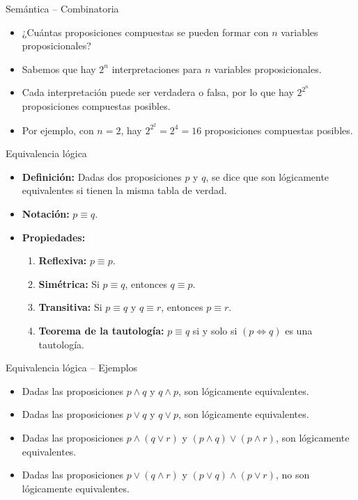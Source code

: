 \documentclass[dvisvgm,hypertex,aspectratio=169]{beamer}
\begin{document}
\begin{frame}{Semántica -- Combinatoria}
  \begin{itemize}[<+->]
    \item ¿Cuántas proposiciones compuestas se pueden formar con $n$ variables proposicionales?
    \item Sabemos que hay $2^n$ interpretaciones para $n$ variables proposicionales.
    \item Cada interpretación puede ser verdadera o falsa, por lo que hay $2^{2^n}$ proposiciones compuestas posibles.
    \item Por ejemplo, con $n = 2$, hay $2^{2^2} = 2^4 = 16$ proposiciones compuestas posibles.
  \end{itemize}
\end{frame}
\begin{frame}{Equivalencia lógica}
  \begin{itemize}[<+->]
    \item \textbf{Definición:} Dadas dos proposiciones $p$ y $q$, se dice que son lógicamente equivalentes si tienen la misma tabla de verdad.
    \item \textbf{Notación:} $p \equiv q$.
    \item \textbf{Propiedades:}
    \begin{enumerate}
      \item \textbf{Reflexiva:} $p \equiv p$.
      \item \textbf{Simétrica:} Si $p \equiv q$, entonces $q \equiv p$.
      \item \textbf{Transitiva:} Si $p \equiv q$ y $q \equiv r$, entonces $p \equiv r$.
      \item \textbf{Teorema de la tautología:} $p \equiv q$ si y solo si $(p \iff q)$ es una tautología.
    \end{enumerate}
  \end{itemize}
\end{frame}
\begin{frame}{Equivalencia lógica -- Ejemplos}
  \begin{itemize}[<+->]
    \item Dadas las proposiciones $p \land q$ y $q \land p$, son lógicamente equivalentes.
    \item Dadas las proposiciones $p \lor q$ y $q \lor p$, son lógicamente equivalentes.
    \item Dadas las proposiciones $p \land (q \lor r)$ y $(p \land q) \lor (p \land r)$, son lógicamente equivalentes.
    \item Dadas las proposiciones $p \lor (q \land r)$ y $(p \lor q) \land (p \lor r)$, no son lógicamente equivalentes.
  \end{itemize}
\end{frame}
\end{document}

